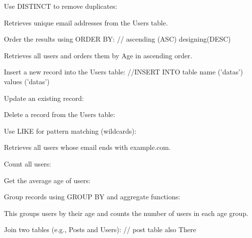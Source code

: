 Use DISTINCT to remove {duplicates}:


Retrieves unique email addresses from the Users table.

Order the results using {ORDER BY:} // ascending (ASC) designing(DESC)


Retrieves all users and orders them by Age in ascending order.


{Insert} a new record into the Users table: //INSERT INTO table name ('datas') values ('datas')


{Update} an existing record:



{Delete} a record from the Users table:


Use LIKE for pattern matching (wildcards):



Retrieves all users whose email ends with example.com.





Count all users:


Get the average age of users:


Group records using GROUP BY and aggregate functions:



This groups users by their age and counts the number of users in each age group.

Join two tables (e.g.,{ Posts} and Users): // post table also There




